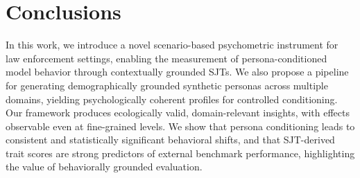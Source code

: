 \documentclass[11pt]{article}
\newcommand{\hexaco}{%
  {\textcolor{hexH}{H}}%
  {\textcolor{hexE}{E}}%
  {\textcolor{hexX}{X}}%
  {\textcolor{hexA}{A}}%
  {\textcolor{hexC}{C}}%
  {\textcolor{hexO}{O}}%
}
\begin{document}




\section{Conclusions}
In this work, we introduce a novel scenario-based psychometric instrument for law enforcement settings, enabling the measurement of persona-conditioned model behavior through contextually grounded SJTs. We also propose a pipeline for generating demographically grounded synthetic personas across multiple domains, yielding psychologically coherent profiles for controlled conditioning. Our framework produces ecologically valid, domain-relevant insights, with effects observable even at fine-grained levels. We show that persona conditioning leads to consistent and statistically significant behavioral shifts, and that SJT-derived trait scores are strong predictors of external benchmark performance, highlighting the value of behaviorally grounded evaluation.

\end{document}
